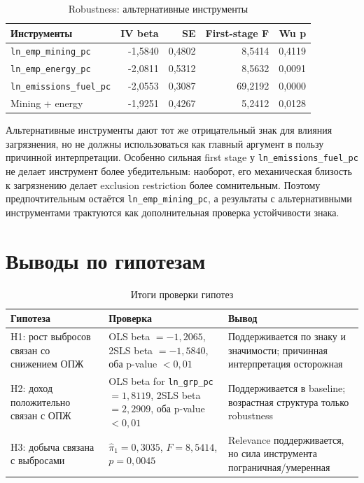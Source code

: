 \documentclass[11pt,a4paper]{article}
\begin{document}
\begin{table}[H]
\centering
\caption{Robustness: альтернативные инструменты}
\label{tab:alt_iv}
\begin{tabular}{lrrrr}
\toprule
\textbf{Инструменты} & \textbf{IV beta} & \textbf{SE} & \textbf{First-stage F} & \textbf{Wu p} \\
\midrule
\texttt{ln\_emp\_mining\_pc} & -1{,}5840 & 0{,}4802 & 8{,}5414 & 0{,}4119 \\
\texttt{ln\_emp\_energy\_pc} & -2{,}0811 & 0{,}5312 & 8{,}5632 & 0{,}0091 \\
\texttt{ln\_emissions\_fuel\_pc} & -2{,}0553 & 0{,}3087 & 69{,}2192 & 0{,}0000 \\
Mining + energy & -1{,}9251 & 0{,}4267 & 5{,}2412 & 0{,}0128 \\
\bottomrule
\end{tabular}
\end{table}

Альтернативные инструменты дают тот же отрицательный знак для влияния загрязнения, но не должны использоваться как главный аргумент в пользу причинной интерпретации. Особенно сильная first stage у \texttt{ln\_emissions\_fuel\_pc} не делает инструмент более убедительным: наоборот, его механическая близость к загрязнению делает exclusion restriction более сомнительным. Поэтому предпочтительным остаётся \texttt{ln\_emp\_mining\_pc}, а результаты с альтернативными инструментами трактуются как дополнительная проверка устойчивости знака.

\section{Выводы по гипотезам}

\begin{table}[H]
\centering
\caption{Итоги проверки гипотез}
\label{tab:hypotheses}
\begin{tabular}{p{}p{}p{}}
\toprule
\textbf{Гипотеза} & \textbf{Проверка} & \textbf{Вывод} \\
\midrule
H1: рост выбросов связан со снижением ОПЖ & OLS beta $=-1{,}2065$, 2SLS beta $=-1{,}5840$, оба p-value $<0{,}01$ & Поддерживается по знаку и значимости; причинная интерпретация осторожная \\
H2: доход положительно связан с ОПЖ & OLS beta for \texttt{ln\_grp\_pc} $=1{,}8119$, 2SLS beta $=2{,}2909$, оба p-value $<0{,}01$ & Поддерживается в baseline; возрастная структура только robustness \\
H3: добыча связана с выбросами & $\hat\pi_1=0{,}3035$, $F=8{,}5414$, $p=0{,}0045$ & Relevance поддерживается, но сила инструмента пограничная/умеренная \\
\bottomrule
\end{tabular}
\end{table}
\end{document}
